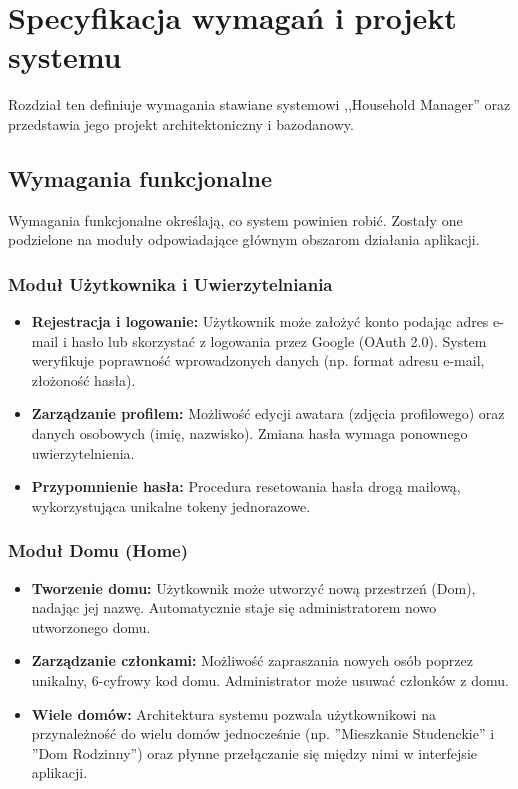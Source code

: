 \chapter{Specyfikacja wymagań i projekt systemu}
\label{rozdzial2}

Rozdział ten definiuje wymagania stawiane systemowi ,,Household Manager'' oraz przedstawia jego projekt architektoniczny i bazodanowy.

\section{Wymagania funkcjonalne}

Wymagania funkcjonalne określają, co system powinien robić. Zostały one podzielone na moduły odpowiadające głównym obszarom działania aplikacji.

\subsection{Moduł Użytkownika i Uwierzytelniania}
\begin{itemize}
    \item \textbf{Rejestracja i logowanie:} Użytkownik może założyć konto podając adres e-mail i hasło lub skorzystać z logowania przez Google (OAuth 2.0). System weryfikuje poprawność wprowadzonych danych (np. format adresu e-mail, złożoność hasła).
    \item \textbf{Zarządzanie profilem:} Możliwość edycji awatara (zdjęcia profilowego) oraz danych osobowych (imię, nazwisko). Zmiana hasła wymaga ponownego uwierzytelnienia.
    \item \textbf{Przypomnienie hasła:} Procedura resetowania hasła drogą mailową, wykorzystująca unikalne tokeny jednorazowe.
\end{itemize}

\subsection{Moduł Domu (Home)}
\begin{itemize}
    \item \textbf{Tworzenie domu:} Użytkownik może utworzyć nową przestrzeń (Dom), nadając jej nazwę. Automatycznie staje się administratorem nowo utworzonego domu.
    \item \textbf{Zarządzanie członkami:} Możliwość zapraszania nowych osób poprzez unikalny, 6-cyfrowy kod domu. Administrator może usuwać członków z domu.
    \item \textbf{Wiele domów:} Architektura systemu pozwala użytkownikowi na przynależność do wielu domów jednocześnie (np. ''Mieszkanie Studenckie'' i ''Dom Rodzinny'') oraz płynne przełączanie się między nimi w interfejsie aplikacji.
\end{itemize}

